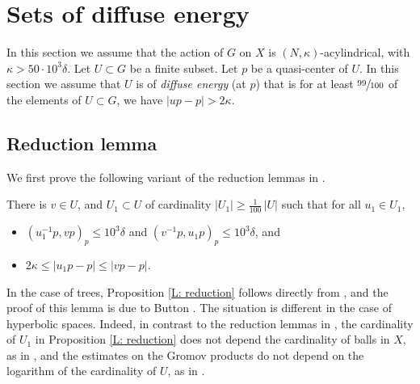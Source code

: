 \section{Sets of diffuse energy}
In this section we assume that the action of $G$ on $X$ is $(N, \kappa)$-acylindrical, with $\kappa > 50\cdot 10^3\delta$.
Let $U \subset G$ be a finite subset.
Let $p$ be a quasi-center of $U$.
In this section we assume that $U$ is of \emph{diffuse energy} (at $p$) that is for at least $\sfrac{99}{100}$ of the elements of $U\subset G$, we have $ |up-p|> 2\kappa$.

\subsection{Reduction lemma}

We first prove the following variant of the reduction lemmas in \cite{delzant_product_2020}.

\begin{prop}[Reduction]\label{L: reduction}
There is $v\in U$, and $U_1\subset U$ of cardinality $|U_1|\geqslant \frac{1}{100}\, |U|$ such that for all $u_1\in U_1$,
\begin{itemize}
\item $(u_1^{-1}p,vp)_p\leqslant 10^3 \delta$ and $(v^{-1}p,u_1p)_p\leqslant 10^3 \delta$, and
\item $2\kappa \leqslant |u_1p-p|\leqslant |vp-p|$.
\end{itemize}
\end{prop}

\begin{rem} In the case of trees, Proposition \ref{L: reduction} follows directly from \cite[Lem.\,6.4]{delzant_product_2020}, and the proof of this lemma is due to Button \cite{button_explicit_2013}. The situation is different in the case of hyperbolic spaces. Indeed, in contrast to the reduction lemmas in \cite[\S 6.1]{delzant_product_2020}, the cardinality of $U_1$ in Proposition \ref{L: reduction} does not depend the cardinality of balls in $X$, as in \cite[Lem.\,6.3]{delzant_product_2020}, and the estimates on the Gromov products do not depend on the logarithm of the cardinality of $U$, as in \cite[Lem.\,6.8]{delzant_product_2020}.
\end{rem}

